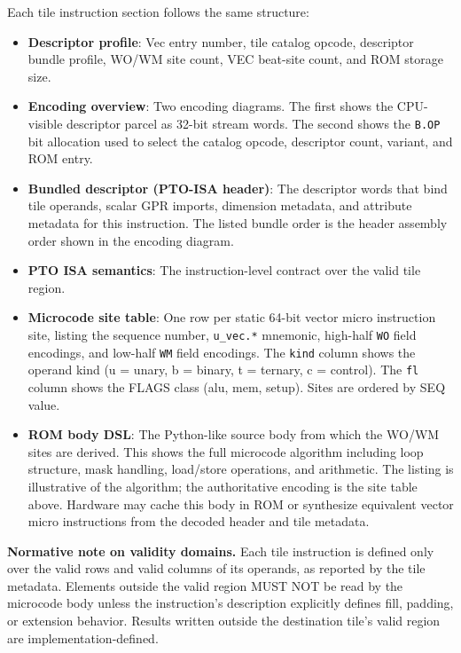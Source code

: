 Each tile instruction section follows the same structure:

\begin{itemize}
\item \textbf{Descriptor profile}: Vec entry number, tile catalog opcode, descriptor bundle profile, WO/WM site count, VEC beat-site count, and ROM storage size.
\item \textbf{Encoding overview}: Two encoding diagrams. The first shows the CPU-visible descriptor parcel as 32-bit stream words. The second shows the \texttt{B.OP} bit allocation used to select the catalog opcode, descriptor count, variant, and ROM entry.
\item \textbf{Bundled descriptor (PTO-ISA header)}: The descriptor words that bind tile operands, scalar GPR imports, dimension metadata, and attribute metadata for this instruction. The listed bundle order is the header assembly order shown in the encoding diagram.
\item \textbf{PTO ISA semantics}: The instruction-level contract over the valid tile region.
\item \textbf{Microcode site table}: One row per static 64-bit vector micro instruction site, listing the sequence number, \texttt{u\_vec.*} mnemonic, high-half \texttt{WO} field encodings, and low-half \texttt{WM} field encodings. The \texttt{kind} column shows the operand kind (u = unary, b = binary, t = ternary, c = control). The \texttt{fl} column shows the FLAGS class (alu, mem, setup). Sites are ordered by SEQ value.
\item \textbf{ROM body DSL}: The Python-like source body from which the WO/WM sites are derived. This shows the full microcode algorithm including loop structure, mask handling, load/store operations, and arithmetic. The listing is illustrative of the algorithm; the authoritative encoding is the site table above. Hardware may cache this body in ROM or synthesize equivalent vector micro instructions from the decoded header and tile metadata.
\end{itemize}

\textbf{Normative note on validity domains.} Each tile instruction is defined only over the valid rows and valid columns of its operands, as reported by the tile metadata. Elements outside the valid region MUST NOT be read by the microcode body unless the instruction's description explicitly defines fill, padding, or extension behavior. Results written outside the destination tile's valid region are implementation-defined.

